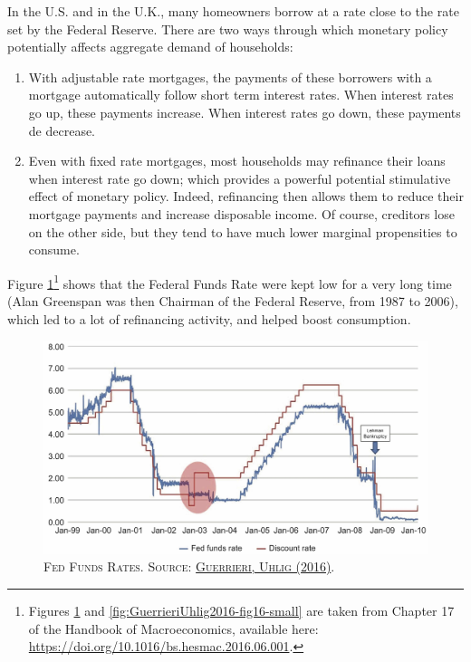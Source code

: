\documentclass[]{book}
\let\rmarkdownfootnote\footnote%
\def\footnote{\protect\rmarkdownfootnote}
\begin{document}
In the U.S. and in the U.K., many homeowners borrow at a rate close to
the rate set by the Federal Reserve. There are two ways through which
monetary policy potentially affects aggregate demand of households:

\begin{enumerate}
\def\labelenumi{\arabic{enumi}.}
\item
  With adjustable rate mortgages, the payments of these borrowers with a
  mortgage automatically follow short term interest rates. When interest
  rates go up, these payments increase. When interest rates go down,
  these payments de decrease.
\item
  Even with fixed rate mortgages, most households may refinance their
  loans when interest rate go down; which provides a powerful potential
  stimulative effect of monetary policy. Indeed, refinancing then allows
  them to reduce their mortgage payments and increase disposable income.
  Of course, creditors lose on the other side, but they tend to have
  much lower marginal propensities to consume.
\end{enumerate}

Figure \ref{fig:GuerrieriUhlig2016-fig17-small}\footnote{Figures
  \ref{fig:GuerrieriUhlig2016-fig17-small} and
  \ref{fig:GuerrieriUhlig2016-fig16-small} are taken from Chapter 17 of
  the Handbook of Macroeconomics, available here:
  \url{https://doi.org/10.1016/bs.hesmac.2016.06.001}.} shows that the
Federal Funds Rate were kept low for a very long time (Alan Greenspan
was then Chairman of the Federal Reserve, from 1987 to 2006), which led
to a lot of refinancing activity, and helped boost consumption.





\begin{figure}

{\centering \includegraphics[width=1\linewidth,height=1\textheight]{figures/GuerrieriUhlig2016-fig17-small} 

}

\caption{\textsc{Fed Funds Rates. Source:
\href{https://doi.org/10.1016/bs.hesmac.2016.06.001}{Guerrieri, Uhlig
(2016)}}.}\label{fig:GuerrieriUhlig2016-fig17-small}
\end{figure}
\end{document}
